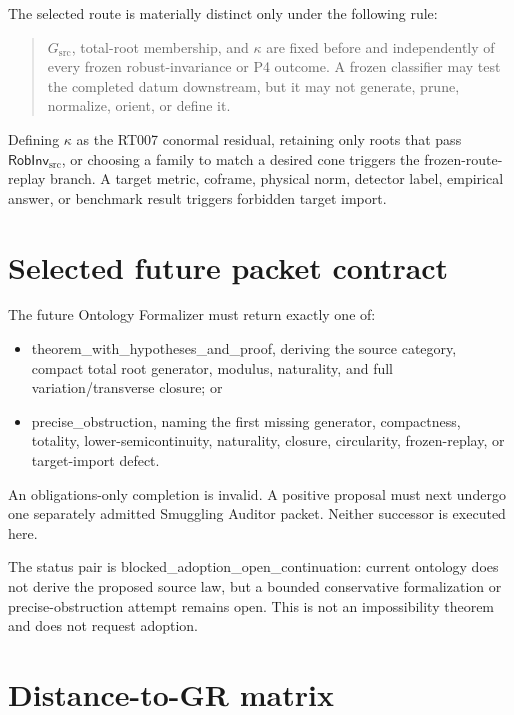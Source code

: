 \documentclass[11pt]{article}
\newcommand{\status}[1]{\textsf{#1}}
\begin{document}
The selected route is materially distinct only under the following rule:
\begin{quote}
\(G_{\mathrm{src}}\), total-root membership, and \(\kappa\) are fixed before
and independently of every frozen robust-invariance or P4 outcome.  A frozen
classifier may test the completed datum downstream, but it may not generate,
prune, normalize, orient, or define it.
\end{quote}
Defining \(\kappa\) as the RT007 conormal residual, retaining only roots that
pass \(\mathsf{RobInv}_{\mathrm{src}}\), or choosing a family to match a
desired cone triggers the frozen-route-replay branch.  A target metric,
coframe, physical norm, detector label, empirical answer, or benchmark result
triggers forbidden target import.

\section{Selected future packet contract}

The future Ontology Formalizer must return exactly one of:
\begin{itemize}
  \item \status{theorem\_with\_hypotheses\_and\_proof}, deriving the source
  category, compact total root generator, modulus, naturality, and full
  variation/transverse closure; or
  \item \status{precise\_obstruction}, naming the first missing generator,
  compactness, totality, lower-semicontinuity, naturality, closure, circularity,
  frozen-replay, or target-import defect.
\end{itemize}
An obligations-only completion is invalid.  A positive proposal must next
undergo one separately admitted Smuggling Auditor packet.  Neither successor
is executed here.

The status pair is \status{blocked\_adoption\_open\_continuation}: current
ontology does not derive the proposed source law, but a bounded conservative
formalization or precise-obstruction attempt remains open.  This is not an
impossibility theorem and does not request adoption.

\section{Distance-to-GR matrix}
\end{document}
